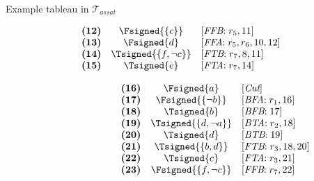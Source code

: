\begin{frame}{Example tableau in $\mathcal{T}_{\textit{assat}}$}
\begin{center}
\begin{minipage}[t]{16cm}
\begin{minipage}[t]{4.5cm}
\[\begin{array}{lcl}
\textbf{(12)}                                      &
  \Fsigned{\{c\}}                                  &
  [\textit{FFB}{:}\;r_5, \text{11}]                \\
\textbf{(13)}                                      &
  \Fsigned{d}                                      &
  [\textit{FFA}{:}\;r_5,r_6, \text{10}, \text{12}] \\
\textbf{(14)}                                      &
  \Tsigned{\{f,\neg c\}}                   &
  [\textit{FTB}{:}\;r_7, \text{8}, \text{11}]      \\
\textbf{(15)}                                      &
  \Tsigned{e}                                      &
  [\textit{FTA}{:}\;r_7, \text{14}]
\end{array}
\]
\end{minipage}
%
\begin{minipage}[t]{6cm}
\[
\hspace{2.5cm}
\begin{array}{lcl}
\textbf{(16)}                                      &
  \Fsigned{a}                                      &
  [\textit{Cut}]                                   \\
\textbf{(17)}                                      &
  \Fsigned{\{\neg b\}}                     &
  [\textit{BFA}{:}\; r_1, \text{16}]               \\
\textbf{(18)}                                      &
  \Tsigned{b}                                      &
  [\textit{BFB}{:}\; \text{17}]                    \\
\textbf{(19)}                                      &
  \Tsigned{\{d,\neg a\}}                   &
  [\textit{BTA}{:}\;r_2, \text{18}]                \\
\textbf{(20)}                                      &
  \Tsigned{d}                                      &
  [\textit{BTB}{:}\;\text{19}]                     \\
\textbf{(21)}                                      &
  \Tsigned{\{b,d\}}                                &
  [\textit{FTB}{:}\;r_3, \text{18}, \text{20}]     \\
\textbf{(22)}                                      &
  \Tsigned{c}                                      &
  [\textit{FTA}{:}\;r_3, \text{21}]                \\
\textbf{(23)}                                      &
  \Fsigned{\{f,\neg c\}}                   &
  [\textit{FFB}{:}\;r_7, \text{22}]                \\

\end{array}\]
\end{minipage}
\end{minipage}
\end{center}
\end{frame}
